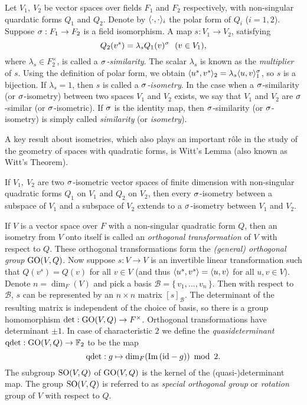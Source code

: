 Let $V_1,\ V_2$ be vector spaces over fields $F_1$ and $F_2$ respectively, with non-singular
quardatic forms $Q_1$ and $Q_2$. Denote by $\langle \cdot, \cdot \rangle_i$ the polar form of 
$Q_i$ ($i = 1,2$). Suppose $\sigma : F_1 \rightarrow F_2$ is a field isomorphism. A map
$s : V_1 \rightarrow V_2$, satisfying
\begin{equation}
	\label{eq:similarity}
	Q_2( v^s ) = \lambda_s Q_1(v)^{\sigma}\ \ (v \in V_1),
\end{equation}
where $\lambda_s \in F_2^{\times}$, is called a \textit{$\sigma$-similarity}. The scalar
$\lambda_s$ is known as the \textit{multiplier} of $s$. Using the definition of polar form, 
we obtain $\langle u^s, v^s \rangle_2 = \lambda_s \langle u, v \rangle_1^{\sigma}$, so $s$ is a bijection. 
If $\lambda_s = 1$, then
$s$ is called a \textit{$\sigma$-isometry}. In the case
when a $\sigma$-similarity (or $\sigma$-isometry) between two spaces $V_1$ and $V_2$ exists, 
we say that $V_1$ and $V_2$ are $\sigma$-similar (or $\sigma$-isometric). 
If $\sigma$ is the identity map, then $\sigma$-similarity (or $\sigma$-isometry) is simply called 
 \textit{similarity} (or \textit{isometry}).

A key result about isometries, which also plays an important r\^{o}le in the study of the geometry
of spaces with quadratic forms, is Witt's Lemma (also known as Witt's Theorem). 

\begin{theorem}
	If $V_1,\ V_2$ are two $\sigma$-isometric 
	vector spaces of finite dimension with non-singular
	quadratic forms $Q_1$ on $V_1$ and $Q_2$ on $V_2$, then every $\sigma$-isometry between a 
	subspace of $V_1$ and a subspace of $V_2$ extends to a \mbox{$\sigma$-isometry}
	between $V_1$ and $V_2$. 
\end{theorem}

If $V$ is a vector space over $F$ 
with a non-singular quadratic form $Q$, then an isometry from $V$ onto
itself is called an \textit{orthogonal transformation} of $V$ with respect to $Q$. These 
orthogonal transformations form the \textit{(general) orthogonal group} $\mathrm{GO}(V,Q)$. Now suppose 
$s : V \rightarrow V$ is an invertible linear transformation such that $Q(v^s) = Q(v)$ for
all $v \in V$ (and thus $\langle u^s, v^s \rangle = \langle u, v \rangle$ for all $u,v \in V$).
Denote $n = \dim_F(V)$ and pick a basis $\mathcal{B} = \{\,v_1,...,v_n\,\}$. 
Then with respect to $\mathcal{B}$, $s$ can be represented by an $n\times n$ matrix
$[s]_{\mathcal{B}}$. The determinant of the resulting matrix is independent of 
the choice of basis, so there is a group homomorphism 
$\det: \mathrm{GO}(V,Q) \rightarrow F^{\times}$. Orthogonal transformations have determinant $\pm 1$.
In case of characteristic $2$ we define the \textit{quasideterminant}
$\mathrm{qdet}:\mathrm{GO}(V,Q) \rightarrow \mathbb{F}_2$ to be the map
\begin{equation}
	\label{eq:qdet}
    \mathrm{qdet}: g \mapsto \dim_F ( \im(\mathrm{id} - g) )\ \operatorname{mod}\ 2.
\end{equation}
The subgroup $\mathrm{SO}(V,Q)$ of $\mathrm{GO}(V,Q)$ is the kernel of the (quasi-)determinant map. The group
$\mathrm{SO}(V,Q)$ is referred to as \textit{special orthogonal group} or \textit{rotation} group
of $V$ with respect to $Q$. 

